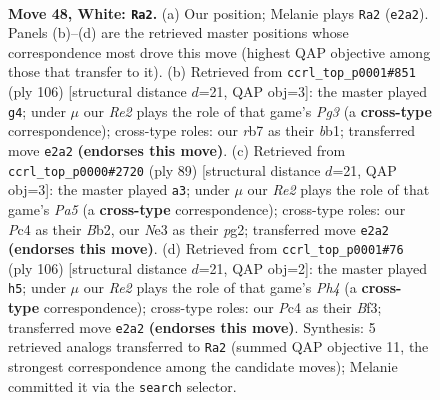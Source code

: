 \documentclass[11pt]{article}
\begin{document}
\clearpage

\begin{figure}[p]\centering
\begin{subfigure}{0.46\textwidth}\centering
\resizebox{\linewidth}{!}{%
\newchessgame
\chessboard[
  setfen={7k/1r4b1/3R4/8/2P5/4N2K/4R3/8 w - - 16 48},
  showmover=false,
  pgfstyle=straightmove, color=movearrow, markmove={e2-a2}
]}
\caption{}
\end{subfigure}\hfill
\begin{subfigure}{0.46\textwidth}\centering
\resizebox{\linewidth}{!}{%
\newchessgame
\chessboard[
  setfen={8/8/2R5/8/1b6/k5P1/7K/1b6 w - - 0 54},
  showmover=false,
  pgfstyle=straightmove, color=movearrow, markmove={g3-g4}
]}
\caption{}
\end{subfigure}
\\[4pt]
\begin{subfigure}{0.46\textwidth}\centering
\resizebox{\linewidth}{!}{%
\newchessgame
\chessboard[
  setfen={8/6k1/2r5/7R/p7/3B4/1b2K1P1/8 b - - 3 45},
  showmover=false,
  pgfstyle=straightmove, color=movearrow, markmove={a4-a3}
]}
\caption{}
\end{subfigure}\hfill
\begin{subfigure}{0.46\textwidth}\centering
\resizebox{\linewidth}{!}{%
\newchessgame
\chessboard[
  setfen={8/6k1/2R5/8/r2b3P/5B2/3K4/8 w - - 0 54},
  showmover=false,
  pgfstyle=straightmove, color=movearrow, markmove={h4-h5}
]}
\caption{}
\end{subfigure}
\caption{\textbf{Move 48, White: \texttt{Ra2}.} (a) Our position; Melanie plays \texttt{Ra2} (\texttt{e2a2}). Panels (b)--(d) are the retrieved master positions whose correspondence most drove this move (highest QAP objective among those that transfer to it). (b) Retrieved from \texttt{ccrl\_top\_p0001\#851} (ply 106) [structural distance $d$=21, QAP obj=3]: the master played \texttt{g4}; under $\mu$ our \emph{Re2} plays the role of that game's \emph{Pg3} (a \textbf{cross-type} correspondence); cross-type roles: our \emph{r}b7 as their \emph{b}b1; transferred move \texttt{e2a2} \textbf{(endorses this move)}. (c) Retrieved from \texttt{ccrl\_top\_p0000\#2720} (ply 89) [structural distance $d$=21, QAP obj=3]: the master played \texttt{a3}; under $\mu$ our \emph{Re2} plays the role of that game's \emph{Pa5} (a \textbf{cross-type} correspondence); cross-type roles: our \emph{P}c4 as their \emph{B}b2, our \emph{N}e3 as their \emph{p}g2; transferred move \texttt{e2a2} \textbf{(endorses this move)}. (d) Retrieved from \texttt{ccrl\_top\_p0001\#76} (ply 106) [structural distance $d$=21, QAP obj=2]: the master played \texttt{h5}; under $\mu$ our \emph{Re2} plays the role of that game's \emph{Ph4} (a \textbf{cross-type} correspondence); cross-type roles: our \emph{P}c4 as their \emph{B}f3; transferred move \texttt{e2a2} \textbf{(endorses this move)}. Synthesis: 5 retrieved analogs transferred to \texttt{Ra2} (summed QAP objective 11, the strongest correspondence among the candidate moves); Melanie committed it via the \texttt{search} selector.}
\label{fig:thought-m94}
\end{figure}
\end{document}
